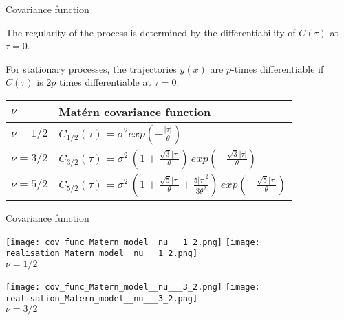 \documentclass[9pt]{beamer}
\newcommand{\absolute}[1]{| #1 |}
\begin{document}
\begin{frame}[t]{Covariance function}

The regularity of the process is determined by the differentiability of $C(\tau)$ at $\tau = 0$.

For stationary processes, the trajectories $y(x)$ are $p$-times differentiable if $C(\tau)$ is $2p$ times differentiable at $\tau = 0$.



\begin{center}
\begin{tabular}{ll}
  \hline
  $\nu$ & Mat\'{e}rn covariance function \\
  \hline
   $\nu = 1/2 $ & $C_{1/2}(\tau) = \sigma^2 exp( - \frac{\absolute{\tau}}{\theta} )$ \\
   $\nu = 3/2 $ &   $C_{3/2}(\tau) = \sigma^2 \, (1+ \frac{\sqrt{3}\absolute{\tau}}{\theta}) \, exp( - \frac{\sqrt{3}\absolute{\tau}}{\theta} )$\\
   $\nu = 5/2 $ &  $C_{5/2}(\tau) = \sigma^2 \, (1+ \frac{\sqrt{5}\absolute{\tau}}{\theta} + \frac{5 {\absolute{\tau}}^2 }{3 \theta^2} ) \, exp( - \frac{\sqrt{5}\absolute{\tau}}{\theta} )$ \\
  \hline
\end{tabular}
\end{center}

\end{frame}

\begin{frame}[t]{Covariance function}

\begin{center}
\texttt{[image: cov\_func\_Matern\_model\_\_nu\_\_\_1\_2.png]} 
\texttt{[image: realisation\_Matern\_model\_\_nu\_\_\_1\_2.png]} \\

$\nu = 1/2$
\end{center}

\begin{center}
\texttt{[image: cov\_func\_Matern\_model\_\_nu\_\_\_3\_2.png]} 
\texttt{[image: realisation\_Matern\_model\_\_nu\_\_\_3\_2.png]} \\

$\nu = 3/2$

\end{center}

\end{frame}
\end{document}
